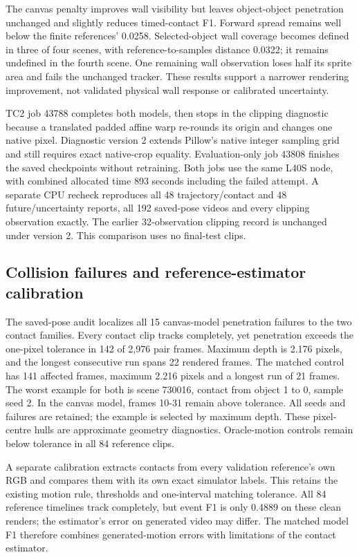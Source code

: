 \documentclass[11pt,a4paper]{article}
\begin{document}
The canvas penalty improves wall visibility but leaves object-object penetration unchanged and slightly reduces timed-contact F1. Forward spread remains well below the finite references' 0.0258. Selected-object wall coverage becomes defined in three of four scenes, with reference-to-samples distance 0.0322; it remains undefined in the fourth scene. One remaining wall observation loses half its sprite area and fails the unchanged tracker. These results support a narrower rendering improvement, not validated physical wall response or calibrated uncertainty.

TC2 job 43788 completes both models, then stops in the clipping diagnostic because a translated padded affine warp re-rounds its origin and changes one native pixel. Diagnostic version 2 extends Pillow's native integer sampling grid and still requires exact native-crop equality. Evaluation-only job 43808 finishes the saved checkpoints without retraining. Both jobs use the same L40S node, with combined allocated time 893 seconds including the failed attempt. A separate CPU recheck reproduces all 48 trajectory/contact and 48 future/uncertainty reports, all 192 saved-pose videos and every clipping observation exactly. The earlier 32-observation clipping record is unchanged under version 2. This comparison uses no final-test clips.

\clearpage
\subsection{Collision failures and reference-estimator calibration}
The saved-pose audit localizes all 15 canvas-model penetration failures to the two contact families. Every contact clip tracks completely, yet penetration exceeds the one-pixel tolerance in 142 of 2,976 pair frames. Maximum depth is 2.176 pixels, and the longest consecutive run spans 22 rendered frames. The matched control has 141 affected frames, maximum 2.216 pixels and a longest run of 21 frames. The worst example for both is scene 730016, contact from object 1 to 0, sample seed 2. In the canvas model, frames 10-31 remain above tolerance. All seeds and failures are retained; the example is selected by maximum depth. These pixel-centre hulls are approximate geometry diagnostics. Oracle-motion controls remain below tolerance in all 84 reference clips.

A separate calibration extracts contacts from every validation reference's own RGB and compares them with its own exact simulator labels. This retains the existing motion rule, thresholds and one-interval matching tolerance. All 84 reference timelines track completely, but event F1 is only 0.4889 on these clean renders; the estimator's error on generated video may differ. The matched model F1 therefore combines generated-motion errors with limitations of the contact estimator.
\end{document}

